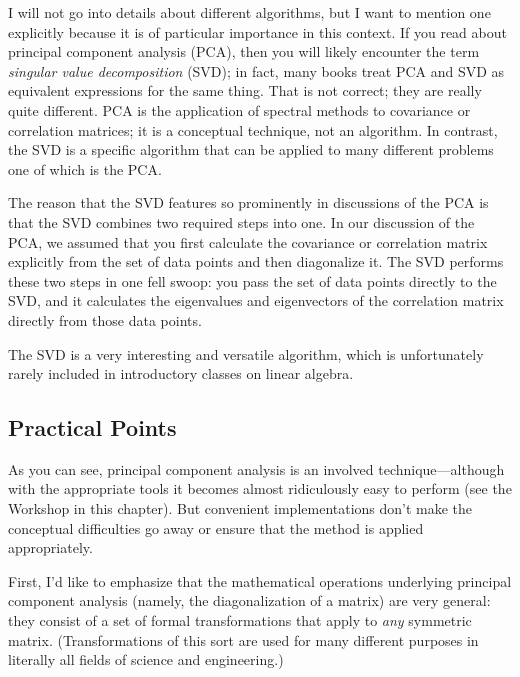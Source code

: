 I will not go into details about different algorithms, but I want to
mention one explicitly because it is of particular importance in this
context.  If you read about principal component analysis (PCA),
then you will likely encounter the term \emph{singular value
  decomposition} (SVD); in fact, many books treat PCA and SVD as
equivalent expressions for the same thing. That is not correct; they
are really quite different. PCA is the application of spectral methods
to covariance or correlation matrices; it is a conceptual technique,
not an algorithm. In contrast, the SVD is a specific algorithm that
can be applied to many different problems one of which is the PCA.

The reason that the SVD features so prominently in discussions of the
PCA is that the SVD combines two required steps into one.  In our
discussion of the PCA, we assumed that you first calculate the
covariance or correlation matrix explicitly from the set of data
points and then diagonalize it. The SVD performs these two steps in
one fell swoop: you pass the set of data points directly to the SVD,
and it calculates the eigenvalues and eigenvectors of the correlation
matrix directly from those data points. 

The SVD is a very interesting and versatile algorithm, which is
unfortunately rarely included in introductory classes on linear
algebra.

\subsection{Practical Points}

 
As you can see, principal component analysis is an involved
technique---although with the appropriate tools it becomes almost
ridiculously easy to perform (see the Workshop in this chapter). But
convenient implementations don't make the conceptual difficulties go
away or ensure that the method is applied appropriately.

First, I'd like to emphasize that the mathematical operations
underlying principal component analysis (namely, the diagonalization
of a matrix) are very general: they consist of a set of formal
transformations that apply to \emph{any} symmetric matrix.
(Transformations of this sort are used for many different purposes
in literally all fields of science and engineering.)


